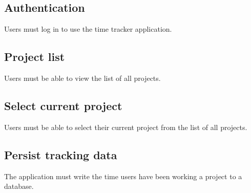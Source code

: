 %
%
\subsection{Authentication}

Users must log in to use the time tracker application.

\subsection{Project list}

Users must be able to view the list of all projects.

\subsection{Select current project}

Users must be able to select their current project from the list of all projects.

\subsection{Persist tracking data}

The application must write the time users have been working a project to a database.

